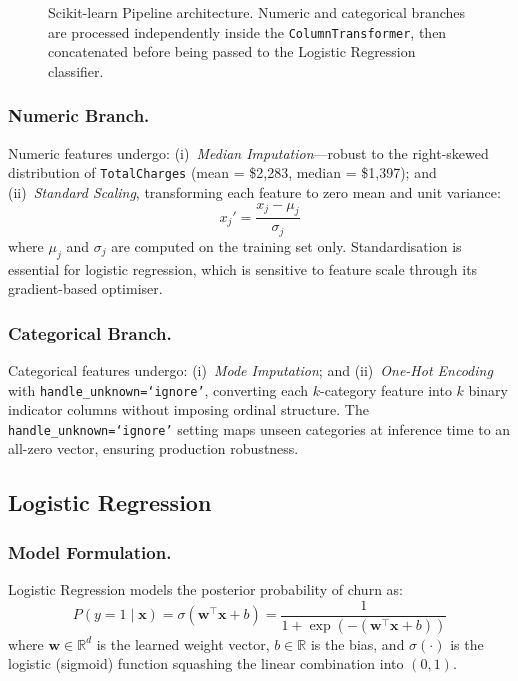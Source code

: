 \documentclass{llncs}
\begin{document}
\begin{figure}[t]
\caption{Scikit-learn Pipeline architecture. Numeric and categorical
  branches are processed independently inside the \texttt{ColumnTransformer},
  then concatenated before being passed to the Logistic Regression classifier.}
\label{fig:pipeline}
\end{figure}

\subsubsection{Numeric Branch.}
Numeric features undergo:
(i)~\emph{Median Imputation}---robust to the right-skewed distribution
of \texttt{TotalCharges} (mean = \$2{,}283, median = \$1{,}397); and
(ii)~\emph{Standard Scaling}, transforming each feature to zero mean
and unit variance:
\begin{equation}
  x_j' = \frac{x_j - \mu_j}{\sigma_j}
  \label{eq:scale}
\end{equation}
where $\mu_j$ and $\sigma_j$ are computed on the training set only.
Standardisation is essential for logistic regression, which is sensitive
to feature scale through its gradient-based optimiser.

\subsubsection{Categorical Branch.}
Categorical features undergo:
(i)~\emph{Mode Imputation}; and
(ii)~\emph{One-Hot Encoding} with \texttt{handle\_unknown=`ignore'},
converting each $k$-category feature into $k$ binary indicator columns
without imposing ordinal structure.
The \texttt{handle\_unknown=`ignore'} setting maps unseen categories at
inference time to an all-zero vector, ensuring production robustness.

\subsection{Logistic Regression}

\subsubsection{Model Formulation.}
Logistic Regression models the posterior probability of churn as:
\begin{equation}
  P(y{=}1 \mid \mathbf{x}) = \sigma\!\left(\mathbf{w}^{\top}\mathbf{x} + b\right)
  = \frac{1}{1 + \exp\!\left(-(\mathbf{w}^{\top}\mathbf{x} + b)\right)}
  \label{eq:sigmoid}
\end{equation}
where $\mathbf{w} \in \mathbb{R}^d$ is the learned weight vector,
$b \in \mathbb{R}$ is the bias, and $\sigma(\cdot)$ is the logistic
(sigmoid) function squashing the linear combination into $(0,1)$.
\end{document}
